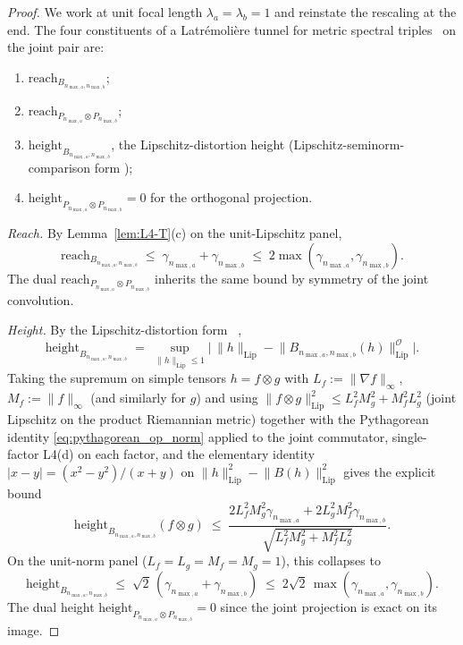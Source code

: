 \documentclass[11pt,a4paper]{article}
\theoremstyle{plain}
\theoremstyle{definition}
\newcommand{\nmaxa}{n_{\max,a}}
\newcommand{\nmaxb}{n_{\max,b}}
\newcommand{\Op}{\mathcal{O}}
\newcommand{\norm}[1]{\lVert #1 \rVert}
\begin{document}
\begin{proof}
We work at unit focal length $\lambda_a = \lambda_b = 1$ and reinstate
the rescaling at the end. The four constituents of a Latr\'emoli\`ere
tunnel for metric spectral triples~\cite{latremoliere_metric_st_2017}
on the joint pair are:
\begin{enumerate}\setlength{\itemsep}{2pt}
\item[(i)] $\mathrm{reach}_{B_{\nmaxa, \nmaxb}}$;
\item[(ii)] $\mathrm{reach}_{P_{\nmaxa} \otimes P_{\nmaxb}}$;
\item[(iii)] $\mathrm{height}_{B_{\nmaxa, \nmaxb}}$, the
Lipschitz-distortion height (Lipschitz-seminorm-comparison form
\cite[Remark~3.8]{loutey_paper38});
\item[(iv)] $\mathrm{height}_{P_{\nmaxa} \otimes P_{\nmaxb}} = 0$ for
the orthogonal projection.
\end{enumerate}

\emph{Reach.} By Lemma~\ref{lem:L4-T}(c) on the unit-Lipschitz panel,
\begin{equation*}
\mathrm{reach}_{B_{\nmaxa, \nmaxb}}
\;\le\; \gamma_{\nmaxa} + \gamma_{\nmaxb}
\;\le\; 2 \max(\gamma_{\nmaxa}, \gamma_{\nmaxb}).
\end{equation*}
The dual $\mathrm{reach}_{P_{\nmaxa} \otimes P_{\nmaxb}}$ inherits the
same bound by symmetry of the joint convolution.

\emph{Height.} By the Lipschitz-distortion form
\cite[\S 4]{latremoliere_metric_st_2017}~\cite[Remark~3.8]{loutey_paper38},
\begin{equation*}
   \mathrm{height}_{B_{\nmaxa, \nmaxb}}
   \;=\; \sup_{\norm{h}_{\mathrm{Lip}} \le 1}
         \bigl|\,\norm{h}_{\mathrm{Lip}}
              - \norm{B_{\nmaxa, \nmaxb}(h)}_{\mathrm{Lip}}^{\Op}\bigr|.
\end{equation*}
Taking the supremum on simple tensors $h = f \otimes g$ with
$L_f := \norm{\nabla f}_\infty$, $M_f := \norm{f}_\infty$ (and
similarly for $g$) and using
$\norm{f \otimes g}_{\mathrm{Lip}}^2 \le L_f^2 M_g^2 + M_f^2 L_g^2$
(joint Lipschitz on the product Riemannian metric) together with the
Pythagorean identity \eqref{eq:pythagorean_op_norm} applied to the
joint commutator, single-factor L4(d) on each factor, and the
elementary identity $|x - y| = (x^2 - y^2)/(x + y)$ on
$\norm{h}_{\mathrm{Lip}}^2 - \norm{B(h)}_{\mathrm{Lip}}^2$ gives the
explicit bound
\begin{equation}\label{eq:height_explicit_T}
   \mathrm{height}_{B_{\nmaxa, \nmaxb}}(f \otimes g)
   \;\le\; \frac{2 L_f^2 M_g^2 \gamma_{\nmaxa}
                 + 2 L_g^2 M_f^2 \gamma_{\nmaxb}}
              {\sqrt{L_f^2 M_g^2 + M_f^2 L_g^2}}.
\end{equation}
On the unit-norm panel ($L_f = L_g = M_f = M_g = 1$), this collapses to
\begin{equation}\label{eq:height_unit_panel}
   \mathrm{height}_{B_{\nmaxa, \nmaxb}}
   \;\le\; \sqrt{2}\,(\gamma_{\nmaxa} + \gamma_{\nmaxb})
   \;\le\; 2\sqrt{2}\,\max(\gamma_{\nmaxa}, \gamma_{\nmaxb}).
\end{equation}
The dual height $\mathrm{height}_{P_{\nmaxa} \otimes P_{\nmaxb}} = 0$
since the joint projection is exact on its image.


\end{proof}
\end{document}

